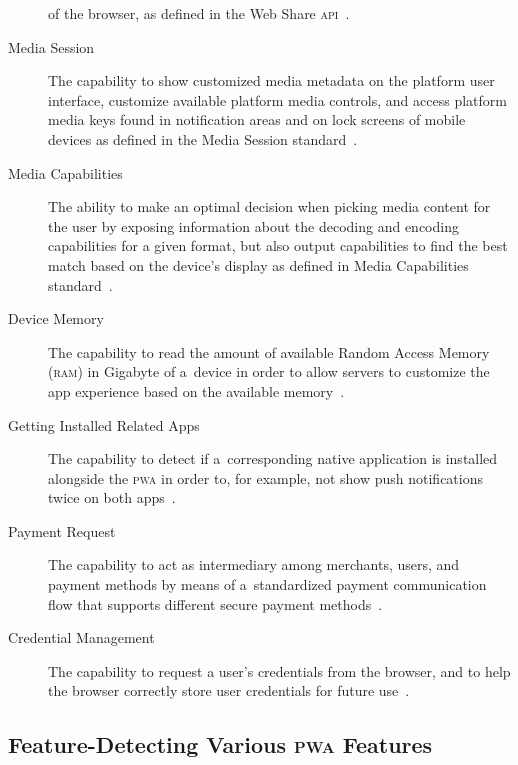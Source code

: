 \documentclass[sigconf]{acmart}
\begin{document}
\begin{description}
    of the browser, as defined in the Web Share \textsc{api}~\cite{giuca2017webshare}.
  \item[Media Session] The capability to show customized media metadata
    on the platform user interface, customize available platform media controls,
    and access platform media keys found in notification areas
    and on lock screens of mobile devices
    as defined in the Media Session standard~\cite{lamouri2017mediasessionapi}.
  \item[Media Capabilities] The ability to make an optimal decision
    when picking media content for the user by exposing information
    about the decoding and encoding capabilities for a given format,
    but also output capabilities to find the best match based on the device's display
    as defined in Media Capabilities standard~\cite{lamouri2017mediacapabilities}.
  \item[Device Memory] The capability to read the amount of available
    Random Access Memory (\textsc{ram}) in Gigabyte
    of a~device in order to allow servers to customize the app experience
    based on the available memory~\cite{panicker2017devicememory}.
  \item[Getting Installed Related Apps] The capability to detect if a~corresponding
    native application is installed alongside the \textsc{pwa} in order to,
    for example, not show push notifications twice on both apps~\cite{kinlan2017relatedapps}.
  \item[Payment Request] The capability to act as intermediary among merchants,
    users, and payment methods by means of a~standardized payment communication flow
    that supports different secure payment methods~\cite{bateman2017paymentrequest}.
  \item[Credential Management] The capability to request a user's credentials
    from the browser, and to help the browser correctly store user credentials
    for future use~\cite{west2017credentialmanagement}.
\end{description} 

\subsection{Feature-Detecting Various \textsc{pwa} Features}
\end{document}
